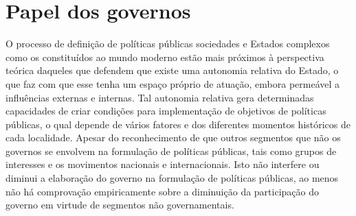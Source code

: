 \section{Papel dos governos}


O processo de definição de políticas públicas sociedades e Estados complexos como os constituídos ao mundo moderno estão mais próximos à perspectiva teórica daqueles que defendem que existe uma autonomia relativa do Estado, o que faz com que esse tenha um espaço próprio de atuação, embora permeável a influências externas e internas.
Tal autonomia relativa gera determinadas capacidades de criar condições para implementação de objetivos de políticas públicas, o qual depende de vários fatores e dos diferentes momentos históricos de cada localidade.
Apesar do reconhecimento de que outros segmentos que não os governos se envolvem na formulação de políticas públicas, tais como grupos de interesses e os movimentos nacionais e internacionais. Isto não interfere ou diminui a elaboração do governo na formulação de políticas públicas, ao menos não há comprovação empiricamente sobre a diminuição da participação do governo em virtude de segmentos não governamentais.
